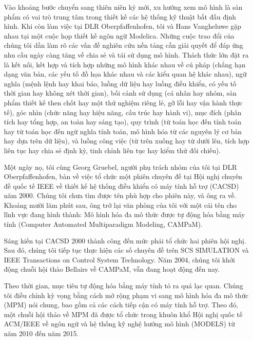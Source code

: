 Vào khoảng bước chuyển sang thiên niên kỷ mới, xu hướng xem mô hình là sản phẩm có vai trò trung tâm trong thiết kế các hệ thống kỹ thuật bắt đầu định hình. Khi còn làm việc tại DLR Oberpfaffenhofen, tôi và Hans Vangheluwe gặp nhau tại một cuộc họp thiết kế ngôn ngữ Modelica. Những cuộc trao đổi của chúng tôi dần làm rõ các vấn đề nghiên cứu nền tảng cần giải quyết để đáp ứng nhu cầu ngày càng tăng về chia sẻ và tái sử dụng mô hình. Thách thức lớn đặt ra là kết nối, kết hợp và tích hợp những mô hình khác nhau về cú pháp (chẳng hạn dạng văn bản, các yếu tố đồ họa khác nhau và các kiểu quan hệ khác nhau), ngữ nghĩa (mệnh lệnh hay khai báo, luồng dữ liệu hay luồng điều khiển, có yếu tố thời gian hay không xét thời gian), bối cảnh sử dụng (cá nhân hay nhóm, sản phẩm thiết kế then chốt hay một thử nghiệm riêng lẻ, gỡ lỗi hay vận hành thực tế), góc nhìn (chức năng hay hiệu năng, cấu trúc hay hành vi), mục đích (phân tích hay tổng hợp, an toàn hay sáng tạo), quy trình (từ toán học đến tính toán hay từ toán học đến ngữ nghĩa tính toán, mô hình hóa từ các nguyên lý cơ bản hay dựa trên dữ liệu), và luồng công việc (từ trên xuống hay từ dưới lên, tích hợp liên tục hay chia sẻ định kỳ, tinh chỉnh liên tục hay kiểm thử đối chiếu).

Một ngày nọ, tôi cùng Georg Gruebel, người phụ trách nhóm của tôi tại DLR Oberpfaffenhofen, bàn về việc tổ chức một phiên chuyên đề tại Hội nghị chuyên đề quốc tế IEEE về thiết kế hệ thống điều khiển có máy tính hỗ trợ (CACSD) năm 2000. Chúng tôi chưa tìm được tên phù hợp cho phiên này, và ông ra về. Khoảng mười lăm phút sau, ông trở lại văn phòng của tôi với một cái tên cho lĩnh vực đang hình thành: Mô hình hóa đa mô thức được tự động hóa bằng máy tính (Computer Automated Multiparadigm Modeling, CAMPaM).

Sáng kiến tại CACSD 2000 thành công đến mức phải tổ chức hai phiên hội nghị. Sau đó, chúng tôi tiếp tục thực hiện các số chuyên đề trên SCS SIMULATION và IEEE Transactions on Control System Technology. Năm 2004, chúng tôi khởi động chuỗi hội thảo Bellairs về CAMPaM, vẫn đang hoạt động đến nay.

Theo thời gian, mục tiêu tự động hóa bằng máy tính tỏ ra quá lạc quan. Chúng tôi điều chỉnh kỳ vọng bằng cách mở rộng phạm vi sang mô hình hóa đa mô thức (MPM) nói chung, bao gồm cả các cách tiếp cận có máy tính hỗ trợ. Theo đó, một chuỗi hội thảo về MPM đã được tổ chức trong khuôn khổ Hội nghị quốc tế ACM/IEEE về ngôn ngữ và hệ thống kỹ nghệ hướng mô hình (MODELS) từ năm 2010 đến năm 2015.

